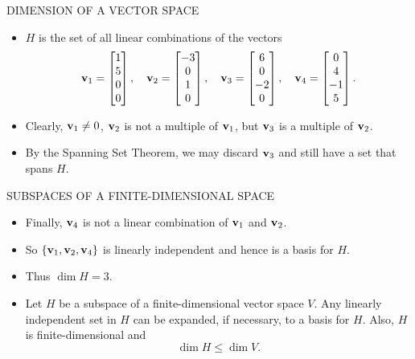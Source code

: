 \begin{frame}[shrink=10]{DIMENSION OF A VECTOR SPACE}
\begin{itemize}
\item $H$ is the set of all linear combinations of the vectors
\[
\mathbf{v}_1=\begin{bmatrix}1\\5\\0\\0\end{bmatrix},\quad
\mathbf{v}_2=\begin{bmatrix}-3\\0\\1\\0\end{bmatrix},\quad
\mathbf{v}_3=\begin{bmatrix}6\\0\\-2\\0\end{bmatrix},\quad
\mathbf{v}_4=\begin{bmatrix}0\\4\\-1\\5\end{bmatrix}.
\]
\item Clearly, $\mathbf{v}_1\neq0$, $\mathbf{v}_2$ is not a multiple of $\mathbf{v}_1$, but $\mathbf{v}_3$ is a multiple of $\mathbf{v}_2$.
\item By the Spanning Set Theorem, we may discard $\mathbf{v}_3$ and still have a set that spans $H$.
\end{itemize}
\end{frame}

\begin{frame}[shrink=8]{SUBSPACES OF A FINITE-DIMENSIONAL SPACE}
\begin{itemize}
\item Finally, $\mathbf{v}_4$ is not a linear combination of $\mathbf{v}_1$ and $\mathbf{v}_2$.
\item So $\{\mathbf{v}_1,\mathbf{v}_2,\mathbf{v}_4\}$ is linearly independent and hence is a basis for $H$.
\item Thus $\dim H=3$.
\item {} Let $H$ be a subspace of a finite-dimensional vector space $V$. Any linearly independent set in $H$ can be expanded, if necessary, to a basis for $H$. Also, $H$ is finite-dimensional and
\[
\dim H\leq\dim V.
\]
\end{itemize}
\end{frame}

